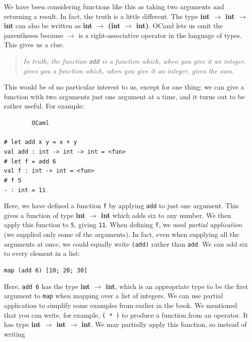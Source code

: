 \documentclass[]{book}
\newcommand{\smspace}{\vspace{4mm}}
\begin{document}
\noindent We have been considering functions like this as taking two arguments and returning a result. In fact, the truth is a little different. The type \textbf{\textsf{int $\rightarrow$ int $\rightarrow$ int}} can also be written as \textbf{\textsf{int $\rightarrow$ \textmd{(}int $\rightarrow$ int\textmd{)}}}. OCaml lets us omit the parentheses because \textbf{\textsf{$\rightarrow$}} is a right-associative operator in the language of types. This gives us a clue.

\begin{quote}
\textit{In truth, the function \texttt{add} is a function which, when you give it an integer, gives you a function which, when you give it an integer, gives the sum.}
\end{quote}

\noindent This would be of no particular interest to us, except for one thing: we can give a function with two arguments just one argument at a time, and it turns out to be rather useful. For example:

\smspace
\noindent\verb!        OCaml!\\
\noindent\\
\noindent\verb!# let add x y = x + y!\\
\noindent\texttt{val add :\ int -> int -> int = <fun>}\\
\noindent\verb!# let f = add 6!\\
\noindent\verb!val f : int -> int = <fun>!\\
\noindent\verb!# f 5!\\
\noindent\verb!- : int = 11!
\smspace

\noindent Here, we have defined a function \texttt{f} by applying \texttt{add} to just one argument. This gives a function of type \textbf{\textsf{int $\rightarrow$ int}} which adds six to any number. We then apply this function to \texttt{5}, giving \texttt{11}. When defining \texttt{f}, we used \textit{partial application} (we supplied only some of the arguments).  In fact, even when supplying all the arguments at once, we could equally write \texttt{(add)} rather than \texttt{add}. We can add six to every element in a list:

\smspace
\texttt{map (add 6) [10; 20; 30]}
\smspace

\noindent Here, \texttt{add 6} has the type \textsf{\textbf{int $\rightarrow$ int}}, which is an appropriate type to be the first argument to \texttt{map} when mapping over a list of integers. We can use partial application to simplify some examples from earlier in the book. We mentioned that you can write, for example, \texttt{( * )} to produce a function from an operator. It has type \textbf{\textsf{int $\rightarrow$ int $\rightarrow$ int}}. We may partially apply this function, so instead of writing
\end{document}
